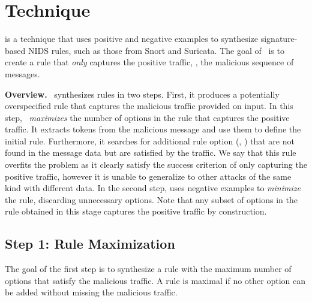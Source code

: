 \documentclass[runningheads]{llncs}
\begin{document}


  

\section{Technique}

\tname{} is a technique that uses positive and negative examples to
synthesize signature-based NIDS rules, such as those from Snort and
Suricata. The goal of \tname\ is to create a rule that \emph{only}
captures the positive traffic, \ie{}, the malicious sequence of
messages. 

\vspace{1ex}
\noindent\textbf{Overview.}~\tname{} synthesizes rules in two
steps. First, it produces a potentially overspecified rule that
captures the malicious traffic provided on input. In this step,
\tname\ \emph{maximizes} the number of options in the rule that
captures the positive traffic. It extracts tokens from the malicious
message and use them to define the initial rule. Furthermore, it
searches for additional rule option (\eg, ) that are not
found in the message data but are satisfied by the traffic. We say
that this rule overfits the problem as it clearly satisfy the success
criterion of only capturing the positive traffic, however it is unable
to generalize to other attacks of the same kind with different
data. In the second step, \tname{} uses negative examples to
\emph{minimize} the rule, discarding unnecessary options. Note that
any subset of options in the rule obtained in this stage captures the
positive traffic by construction. 

\subsection{Step 1: Rule Maximization}
\pgfplotsset{width=6cm,compat=1.8}

The goal of the first step is to synthesize a rule with the maximum
number of options that satisfy the malicious traffic. A rule is
maximal if no other option can be added without missing the malicious
traffic.
\end{document}
